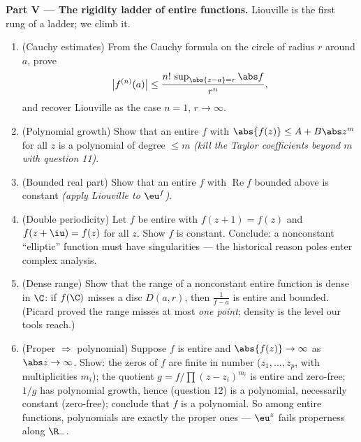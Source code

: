 \begin{problem}
\medskip
\noindent\textbf{Part V --- The rigidity ladder of entire
functions.} Liouville is the first rung of a ladder; we climb
it.
\begin{enumerate}[resume]
  \item (Cauchy estimates) From the Cauchy formula on the
        circle of radius $r$ around $a$, prove
        \[
        \bigl|f^{(n)}(a)\bigr| \leq
        \frac{n!\,\sup_{\abs{z-a}=r}\abs f}{r^n} ,
        \]
        and recover Liouville as the case $n = 1$, $r \to
        \infty$.
  \item (Polynomial growth) Show that an entire $f$ with
        $\abs{f(z)} \leq A + B\abs z^m$ for all $z$ is a
        polynomial of degree $\leq m$ \emph{(kill the Taylor
        coefficients beyond $m$ with question 11)}.
  \item (Bounded real part) Show that an entire $f$ with
        $\operatorname{Re}f$ bounded above is constant
        \emph{(apply Liouville to $\eu^{f}$)}.
  \item (Double periodicity) Let $f$ be entire with $f(z + 1)
        = f(z)$ and $f(z + \iu) = f(z)$ for all $z$. Show $f$
        is constant. Conclude: a nonconstant ``elliptic''
        function must have singularities --- the historical
        reason poles enter complex analysis.
  \item (Dense range) Show that the range of a nonconstant
        entire function is dense in $\C$: if $f(\C)$ misses a
        disc $D(a, r)$, then $\frac1{f - a}$ is entire and
        bounded. (Picard proved the range misses at most
        \emph{one point}; density is the level our tools
        reach.)
  \item (Proper $\Rightarrow$ polynomial) Suppose $f$ is
        entire and $\abs{f(z)} \to \infty$ as $\abs z \to
        \infty$. Show: the zeros of $f$ are finite in number
        ($z_1, \dots, z_p$, with multiplicities $m_i$); the
        quotient $g = f/\prod(z - z_i)^{m_i}$ is entire and
        zero-free; $1/g$ has polynomial growth, hence
        (question 12) is a polynomial, necessarily constant
        (zero-free); conclude that $f$ is a polynomial. So
        among entire functions, polynomials are exactly the
        proper ones --- $\eu^z$ fails properness along
        $\R_-$.
\end{enumerate}


\end{problem}
